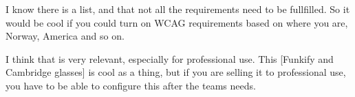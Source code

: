 \begin{displayquote}
    I know there is a list, and that not all the requirements need to be fullfilled. So it would be cool if you could turn on WCAG requirements based on where you are, Norway, America and so on. 
    
    I think that is very relevant, especially for professional use. This [Funkify and Cambridge glasses] is cool as a thing, but if you are selling it to professional use, you have to be able to configure this after the teams needs.
\end{displayquote}